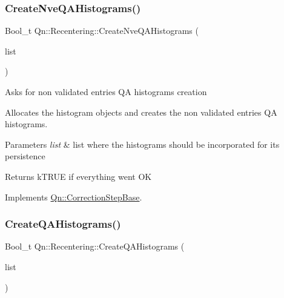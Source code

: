 \mbox{\label{classQn_1_1Recentering_a79b742c62efee3462e65cad7089b1b54}} 
\subsubsection{\texorpdfstring{Create\+Nve\+Q\+A\+Histograms()}{CreateNveQAHistograms()}}
{\footnotesize\ttfamily Bool\+\_\+t Qn\+::\+Recentering\+::\+Create\+Nve\+Q\+A\+Histograms (\begin{DoxyParamCaption}\item[{T\+List $\ast$}]{list }\end{DoxyParamCaption})\hspace{0.3cm}{\ttfamily [virtual]}}

Asks for non validated entries QA histograms creation

Allocates the histogram objects and creates the non validated entries QA histograms. 
\begin{DoxyParams}{Parameters}
{\em list} & list where the histograms should be incorporated for its persistence \\
\hline
\end{DoxyParams}
\begin{DoxyReturn}{Returns}
k\+T\+R\+UE if everything went OK 
\end{DoxyReturn}


Implements \mbox{\hyperlink{classQn_1_1CorrectionStepBase_acb488e715005f027e39c21ae5f4684da}{Qn\+::\+Correction\+Step\+Base}}.

\mbox{\label{classQn_1_1Recentering_a2edebcd0303549d8ca342fdeb913046b}} 
\subsubsection{\texorpdfstring{Create\+Q\+A\+Histograms()}{CreateQAHistograms()}}
{\footnotesize\ttfamily Bool\+\_\+t Qn\+::\+Recentering\+::\+Create\+Q\+A\+Histograms (\begin{DoxyParamCaption}\item[{T\+List $\ast$}]{list }\end{DoxyParamCaption})\hspace{0.3cm}{\ttfamily [virtual]}}

